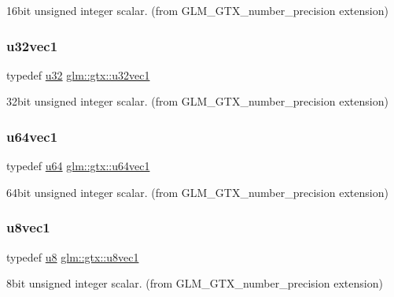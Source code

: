 16bit unsigned integer scalar. (from G\+L\+M\+\_\+\+G\+T\+X\+\_\+number\+\_\+precision extension) 

\mbox{\label{group__gtx__number__precision_gac46a7890b20928df83e734c3ea9557d4}} 
\subsubsection{\texorpdfstring{u32vec1}{u32vec1}}
{\footnotesize\ttfamily typedef \mbox{\hyperlink{group__gtc__type__precision_ga54e837745059fd29017bed71cfa0a8db}{u32}} \mbox{\hyperlink{group__gtx__number__precision_gac46a7890b20928df83e734c3ea9557d4}{glm\+::gtx\+::u32vec1}}}



32bit unsigned integer scalar. (from G\+L\+M\+\_\+\+G\+T\+X\+\_\+number\+\_\+precision extension) 

\mbox{\label{group__gtx__number__precision_ga92812a1d7e746bcaba61d2f5a64afc52}} 
\subsubsection{\texorpdfstring{u64vec1}{u64vec1}}
{\footnotesize\ttfamily typedef \mbox{\hyperlink{group__gtc__type__precision_ga71cedd4972f9cb1a5e14dfe5ab83ecd7}{u64}} \mbox{\hyperlink{group__gtx__number__precision_ga92812a1d7e746bcaba61d2f5a64afc52}{glm\+::gtx\+::u64vec1}}}



64bit unsigned integer scalar. (from G\+L\+M\+\_\+\+G\+T\+X\+\_\+number\+\_\+precision extension) 

\mbox{\label{group__gtx__number__precision_ga35ae7849593a354420e4f52d1b36c2d6}} 
\subsubsection{\texorpdfstring{u8vec1}{u8vec1}}
{\footnotesize\ttfamily typedef \mbox{\hyperlink{group__gtc__type__precision_ga5e3dc67373d5068997d2d9f41c9024d2}{u8}} \mbox{\hyperlink{group__gtx__number__precision_ga35ae7849593a354420e4f52d1b36c2d6}{glm\+::gtx\+::u8vec1}}}



8bit unsigned integer scalar. (from G\+L\+M\+\_\+\+G\+T\+X\+\_\+number\+\_\+precision extension) 

